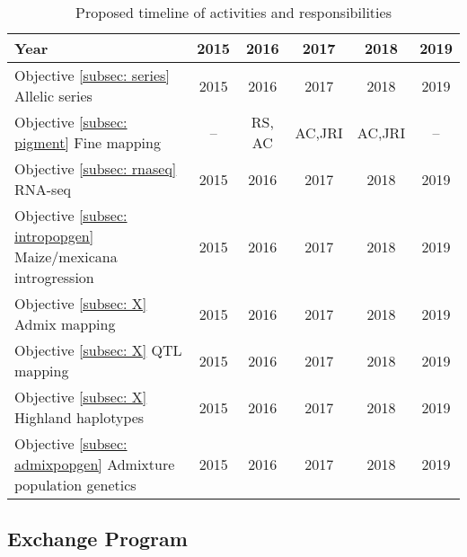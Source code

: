 \begin{table}[H]
\begin{center}
\caption{Proposed timeline of activities and responsibilities}\label{timeline}
\begin{tabular}{lccccc}\\\toprule  
    \rowcolor{gray!50}
Year & 2015 & 2016 & 2017 & 2018 & 2019 \\\midrule
Objective \ref{subsec: series} Allelic series & 2015 & 2016 & 2017 & 2018 & 2019\\\midrule
Objective \ref{subsec: pigment} Fine mapping & -- & RS, AC & AC,JRI & AC,JRI & -- \\\midrule
Objective \ref{subsec: rnaseq} RNA-seq & 2015 & 2016 & 2017 & 2018 & 2019\\\midrule
Objective \ref{subsec: intropopgen} Maize/mexicana introgression & 2015 & 2016 & 2017 & 2018 & 2019 \\\midrule
Objective \ref{subsec: X} Admix mapping & 2015 & 2016 & 2017 & 2018 & 2019 \\\midrule
Objective \ref{subsec: X} QTL mapping & 2015 & 2016 & 2017 & 2018 & 2019 \\\midrule
Objective \ref{subsec: X} Highland haplotypes & 2015 & 2016 & 2017 & 2018 & 2019 \\\midrule
Objective \ref{subsec: admixpopgen} Admixture population genetics & 2015 & 2016 & 2017 & 2018 & 2019\\ \bottomrule
\end{tabular}
\end{center}
\end{table} 




\subsection*{Exchange Program} 

